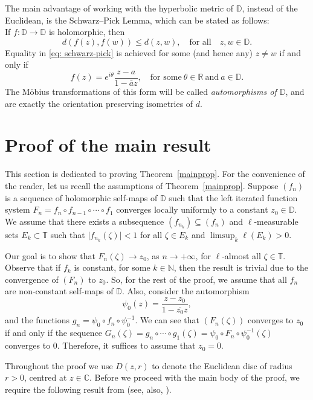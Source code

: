 \documentclass[11pt, reqno]{amsart}
\theoremstyle{definition}
\numberwithin{equation}{section}
\newcommand{\R}{\mathbb{R}}
\newcommand{\N}{\mathbb{N}}
\newcommand{\C}{\mathbb{C}}
\newcommand{\D}{\mathbb{D}}
\newcommand{\T}{\mathbb{T}}
\renewcommand{\leq}{\leqslant}
\begin{document}
The main advantage of working with the hyperbolic metric of $\D$, instead of the Euclidean, is the Schwarz--Pick Lemma, which can be stated as follows:\\
If $f\colon\D\to\D$ is holomorphic, then 
\begin{equation}\label{eq: schwarz-pick}
d(f(z),f(w))\leq d(z,w),\quad\text{for all}\quad z,w\in \D.
\end{equation}
Equality in \eqref{eq: schwarz-pick} is achieved for some (and hence any) $z\neq w$ if and only if 
\[
f(z)=e^{i\theta}\frac{z-a}{1-\overline{a}z}, \quad \text{for some}\ \theta\in\R \ \text{and}\ a\in\D.
\]
The M\"obius transformations of this form will be called \emph{automorphisms of $\D$}, and are exactly the orientation preserving isometries of $d$.

\section{Proof of the main result}
This section is dedicated to proving Theorem~\ref{mainprop}. For the convenience of the reader, let us recall the assumptions of Theorem~\ref{mainprop}. Suppose $(f_n)$ is a sequence of holomorphic self-maps of $\D$ such that the left iterated function system $F_n=f_n\circ f_{n-1}\circ \cdots\circ f_1$ converges locally uniformly to a constant $z_0\in\D$. We assume that there exists a subsequence $(f_{n_k})\subseteq (f_n)$ and $\ell$-measurable sets $E_k\subset \T$ such that $\lvert f_{n_k}(\zeta)\rvert<1$ for all $\zeta\in E_k$ and $\limsup_k \ell(E_k)>0$. 

Our goal is to show that $F_n(\zeta)\to z_0$, as $n\to+\infty$, for $\ell$-almost all $\zeta\in\T$. Observe that if $f_k$ is constant, for some $k\in\N$, then the result is trivial due to the convergence of $(F_n)$ to $z_0$. So, for the rest of the proof, we assume that all $f_n$ are non-constant self-maps of $\D$. Also, consider the automorphism 
\[
\psi_0(z)=\frac{z-z_0}{1-\overline{z_0}z},
\]
and the functions $g_n=\psi_0 \circ f_n\circ \psi_0^{-1}$. We can see that $(F_n(\zeta))$ converges to $z_0$ if and only if the sequence $G_n(\zeta)=g_n\circ\cdots\circ g_1(\zeta)=\psi_0\circ F_n\circ \psi_0^{-1}(\zeta)$ converges to 0. Therefore, it suffices to assume that $z_0=0$.

Throughout the proof we use $D(z,r)$ to denote the Euclidean disc of radius $r>0$, centred at $z\in\C$. Before we proceed with the main body of the proof, we require the following result from \cite[Theorem 3.3]{ChSh2019} (see, also, \cite[Theorem 4.1 (ii)]{AbCh2022}).
\end{document}
